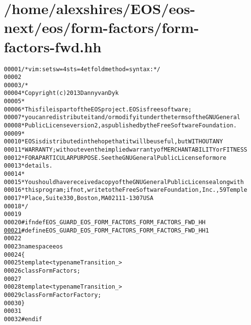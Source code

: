 \hypertarget{form-factors-fwd_8hh_source}{
\section{/home/alexshires/EOS/eos-\/next/eos/form-\/factors/form-\/factors-\/fwd.hh}
}


\begin{footnotesize}\begin{alltt}
00001 \textcolor{comment}{/* vim: set sw=4 sts=4 et foldmethod=syntax : */}
00002 
00003 \textcolor{comment}{/*}
00004 \textcolor{comment}{ * Copyright (c) 2013 Danny van Dyk}
00005 \textcolor{comment}{ *}
00006 \textcolor{comment}{ * This file is part of the EOS project. EOS is free software;}
00007 \textcolor{comment}{ * you can redistribute it and/or modify it under the terms of the GNU General}
00008 \textcolor{comment}{ * Public License version 2, as published by the Free Software Foundation.}
00009 \textcolor{comment}{ *}
00010 \textcolor{comment}{ * EOS is distributed in the hope that it will be useful, but WITHOUT ANY}
00011 \textcolor{comment}{ * WARRANTY; without even the implied warranty of MERCHANTABILITY or FITNESS}
00012 \textcolor{comment}{ * FOR A PARTICULAR PURPOSE.  See the GNU General Public License for more}
00013 \textcolor{comment}{ * details.}
00014 \textcolor{comment}{ *}
00015 \textcolor{comment}{ * You should have received a copy of the GNU General Public License along with}
00016 \textcolor{comment}{ * this program; if not, write to the Free Software Foundation, Inc., 59 Temple}
00017 \textcolor{comment}{ * Place, Suite 330, Boston, MA  02111-1307  USA}
00018 \textcolor{comment}{ */}
00019 
00020 \textcolor{preprocessor}{#ifndef EOS\_GUARD\_EOS\_FORM\_FACTORS\_FORM\_FACTORS\_FWD\_HH}
\hypertarget{form-factors-fwd_8hh_source_l00021}{}\hyperlink{form-factors-fwd_8hh_a9a94f9ca1be35f29c38f445c4c72ddaa}{00021} \textcolor{preprocessor}{}\textcolor{preprocessor}{#define EOS\_GUARD\_EOS\_FORM\_FACTORS\_FORM\_FACTORS\_FWD\_HH 1}
00022 \textcolor{preprocessor}{}
00023 \textcolor{keyword}{namespace }eos
00024 \{
00025     \textcolor{keyword}{template} <\textcolor{keyword}{typename} Transition\_>
00026     \textcolor{keyword}{class }FormFactors;
00027 
00028     \textcolor{keyword}{template} <\textcolor{keyword}{typename} Transition\_>
00029     \textcolor{keyword}{class }FormFactorFactory;
00030 \}
00031 
00032 \textcolor{preprocessor}{#endif}
\end{alltt}\end{footnotesize}
